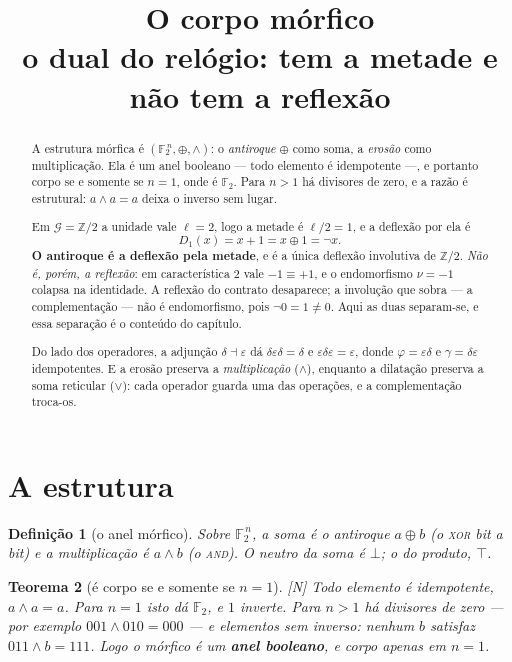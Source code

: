 \documentclass[12pt,a4paper]{article}
\title{O corpo mórfico\\ \large o dual do relógio: tem a metade e não tem a reflexão}
\author{}
\date{}
\newcommand{\ZZ}{\mathbb{Z}}
\newcommand{\FF}{\mathbb{F}_2}
\newcommand{\GG}{\mathcal{G}}
\newcommand{\est}[1]{\textsf{\footnotesize[#1]}}
\newtheorem{definicao}{Definição}[section]
\newtheorem{teorema}[definicao]{Teorema}
\begin{document}
\maketitle

\begin{abstract}
A estrutura mórfica é $(\FF^{\,n},\oplus,\wedge)$: o \emph{antiroque} $\oplus$ como soma, a \emph{erosão} como
multiplicação. Ela é um anel booleano --- todo elemento é idempotente ---, e portanto corpo se e somente se
$n=1$, onde é $\FF$. Para $n>1$ há divisores de zero, e a razão é estrutural: $a\wedge a=a$ deixa o inverso sem
lugar.

\noindent Em $\GG=\ZZ/2$ a unidade vale $\ell=2$, logo a metade é $\ell/2=1$, e a deflexão por ela é
\[
D_1(x)=x+1=x\oplus1=\neg x .
\]
\textbf{O antiroque é a deflexão pela metade}, e é a única deflexão involutiva de $\ZZ/2$. \emph{Não é, porém, a
reflexão}: em característica $2$ vale $-1\equiv+1$, e o endomorfismo $\nu=-1$ colapsa na identidade. A reflexão
do contrato desaparece; a involução que sobra --- a complementação --- não é endomorfismo, pois $\neg0=1\neq0$.
Aqui as duas separam-se, e essa separação é o conteúdo do capítulo.

\noindent Do lado dos operadores, a adjunção $\delta\dashv\varepsilon$ dá $\delta\varepsilon\delta=\delta$ e
$\varepsilon\delta\varepsilon=\varepsilon$, donde $\varphi=\varepsilon\delta$ e $\gamma=\delta\varepsilon$
idempotentes. E a erosão preserva a \emph{multiplicação} ($\wedge$), enquanto a dilatação preserva a soma
reticular ($\vee$): cada operador guarda uma das operações, e a complementação troca-os.
\end{abstract}

\section{A estrutura}

\begin{definicao}[o anel mórfico]\label{def:morfico}
Sobre $\FF^{\,n}$, a soma é o \emph{antiroque} $a\oplus b$ (o \textsc{xor} bit a bit) e a multiplicação é
$a\wedge b$ (o \textsc{and}). O neutro da soma é $\bot$; o do produto, $\top$.
\end{definicao}

\begin{teorema}[é corpo se e somente se $n=1$]\label{teo:socorpon1}
\est{N} Todo elemento é idempotente, $a\wedge a=a$. Para $n=1$ isto dá $\FF$, e $1$ inverte. Para $n>1$ há
divisores de zero --- por exemplo $001\wedge010=000$ --- e elementos sem inverso: nenhum $b$ satisfaz
$011\wedge b=111$. Logo o mórfico é um \textbf{anel booleano}, e corpo apenas em $n=1$.
\end{teorema}
\end{document}
